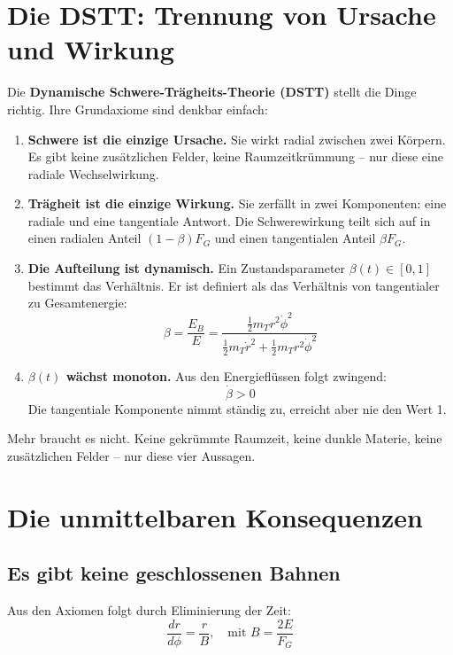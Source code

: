 \documentclass[12pt,a4paper]{article}
\begin{document}
\section{Die DSTT: Trennung von Ursache und Wirkung}

Die \textbf{Dynamische Schwere-Trägheits-Theorie (DSTT)} stellt die Dinge richtig. Ihre Grundaxiome sind denkbar einfach:

\begin{enumerate}
    \item \textbf{Schwere ist die einzige Ursache.} Sie wirkt radial zwischen zwei Körpern. Es gibt keine zusätzlichen Felder, keine Raumzeitkrümmung – nur diese eine radiale Wechselwirkung.
    
    \item \textbf{Trägheit ist die einzige Wirkung.} Sie zerfällt in zwei Komponenten: eine radiale und eine tangentiale Antwort. Die Schwerewirkung teilt sich auf in einen radialen Anteil \((1-\beta)F_G\) und einen tangentialen Anteil \(\beta F_G\).
    
    \item \textbf{Die Aufteilung ist dynamisch.} Ein Zustandsparameter \(\beta(t) \in [0,1]\) bestimmt das Verhältnis. Er ist definiert als das Verhältnis von tangentialer zu Gesamtenergie:
    \[
    \beta = \frac{E_B}{E} = \frac{\frac{1}{2}m_T r^2\dot{\phi}^2}{\frac{1}{2}m_T\dot{r}^2 + \frac{1}{2}m_T r^2\dot{\phi}^2}
    \]
    
    \item \textbf{\(\beta(t)\) wächst monoton.} Aus den Energieflüssen folgt zwingend:
    \[
    \dot{\beta} > 0
    \]
    Die tangentiale Komponente nimmt ständig zu, erreicht aber nie den Wert 1.
\end{enumerate}

Mehr braucht es nicht. Keine gekrümmte Raumzeit, keine dunkle Materie, keine zusätzlichen Felder – nur diese vier Aussagen.

\section{Die unmittelbaren Konsequenzen}

\subsection{Es gibt keine geschlossenen Bahnen}

Aus den Axiomen folgt durch Eliminierung der Zeit:
\[
\frac{dr}{d\phi} = \frac{r}{B}, \quad \text{mit } B = \frac{2E}{F_G}
\]
\end{document}
